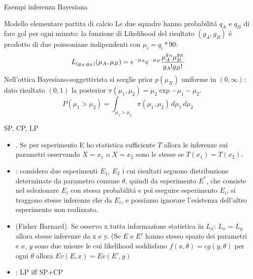 \documentclass[asd-beamer.tex]{subfiles}
\begin{document}
\begin{wordonframe}{Esempi inferenza Bayesiana}
\begin{block}{Modello elementare partita di calcio}
	Le due squadre hanno probabilit\'a $q_A$ e $q_B$ di fare gol per ogni minuto: la funzione di Likelihood del risultato $(g_A,g_B)$ \'e prodotto di due poissoniane indipendenti con $\mu_i=q_i*90$:
	\[L_{(g_A,g_B)}(\mu_A,\mu_B)=e^{-\mu_A}e^{-\mu_B}\frac{\mu_A^{g_A}\mu_B^{g_B}}{g_A!g_B!}\]
	Nell'ottica Bayesiano-soggettivista si sceglie prior $p(\mu_X)$ uniforme in $(0,\infty)$: dato risultato $(0,1)$ la posterior $\pi(\mu_1,\mu_2)=\mu_2\exp{-\mu_1-\mu_2}$.
	\[P(\mu_1>\mu_2)=\int_{\mu_1>\mu_2}\pi(\mu_1,\mu_2)\,d\mu_1\,d\mu_2\]
\end{block}
\end{wordonframe}

\begin{frame}{SP, CP, LP}
	\begin{itemize}
	\item {}. Se per esperimento E ho statistica sufficiente $T$ allora le inferenze sui parametri osservando $X=x_1$ o $X=x_2$ sono le stesse se $T(x_1)=T(x_2)$.
	\item {}: considero due esperimenti $E_1$, $E_2$ i cui risultati seguono distribuzione determinate da parametro comune $\theta$, quindi da esperimento $E^*$, che consiste nel selezionare $E_i$ con stessa probabilit\'a e poi eseguire esperimento $E_i$, si traggono stesse inferenze che da $E_i$, e possiamo ignorare l'esistenza dell'altro esperimento non realizzato.
	\item {} (Fisher Barnard). Se osservo x tutta informazione statistica in $L_x$: $L_x=L_y$ allora stesse inferenze da x e y. (Se $E$ e $E'$ hanno stesso spazio dei parametri e $x$, $y$ sono due misure le cui likelihood soddisfano $f(x,\theta)=cg(y,\theta)$ per ogni $\theta$ allora $Ev(E,x)=Ev(E',y)$
	\item {}: LP iff SP+CP
	\end{itemize}
\end{frame}
\end{document}
